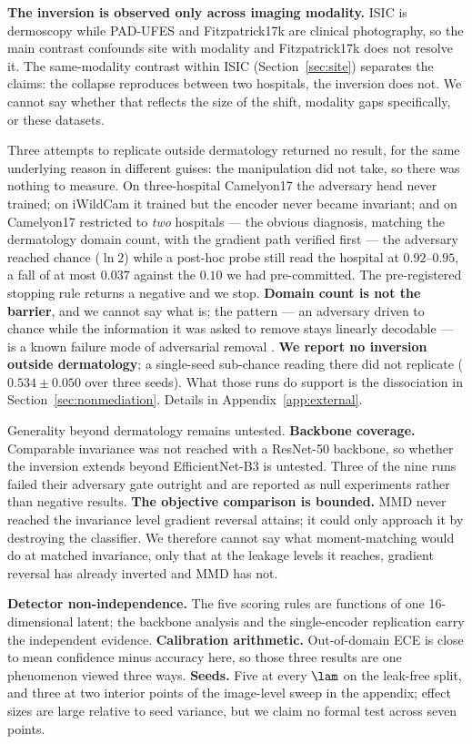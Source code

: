 \textbf{The inversion is observed only across imaging modality.} ISIC is dermoscopy
while PAD-UFES and Fitzpatrick17k are clinical photography, so the main contrast
confounds site with modality and Fitzpatrick17k does not resolve it. The
same-modality contrast within ISIC (Section~\ref{sec:site}) separates the claims: the
collapse reproduces between two hospitals, the inversion does not. We cannot say
whether that reflects the size of the shift, modality gaps specifically, or these
datasets.

Three attempts to replicate outside dermatology returned no result, for the same
underlying reason in different guises: the manipulation did not take, so there was
nothing to measure. On three-hospital Camelyon17 the adversary head never trained; on
iWildCam it trained but the encoder never became invariant; and on Camelyon17
restricted to \emph{two} hospitals --- the obvious diagnosis, matching the dermatology
domain count, with the gradient path verified first --- the adversary reached chance
($\ln 2$) while a post-hoc probe still read the hospital at $0.92$--$0.95$, a fall of
at most $0.037$ against the $0.10$ we had pre-committed. The pre-registered stopping
rule returns a negative and we stop. \textbf{Domain count is not the barrier}, and we
cannot say what is; the pattern --- an adversary driven to chance while the information
it was asked to remove stays linearly decodable --- is a known failure mode of
adversarial removal \cite{elazar2018}. \textbf{We report no inversion outside
dermatology}; a single-seed sub-chance reading there did not replicate
($0.534 \pm 0.050$ over three seeds). What those runs do support is the dissociation in
Section~\ref{sec:nonmediation}. Details in Appendix~\ref{app:external}.

Generality beyond dermatology remains untested. \textbf{Backbone coverage.} Comparable invariance was not reached with a ResNet-50
backbone, so whether the inversion extends beyond EfficientNet-B3 is untested. Three of
the nine runs failed their adversary gate outright and are reported as null experiments
rather than negative results. \textbf{The objective comparison is bounded.} MMD never reached the invariance
level gradient reversal attains; it could only approach it by destroying the
classifier. We therefore cannot say what moment-matching would do at matched
invariance, only that at the leakage levels it reaches, gradient reversal has
already inverted and MMD has not.

\textbf{Detector non-independence.} The five scoring rules are functions of one
16-dimensional latent; the backbone analysis and the single-encoder replication carry
the independent evidence. \textbf{Calibration arithmetic.} Out-of-domain ECE is close
to mean confidence minus accuracy here, so those three results are one phenomenon
viewed three ways. \textbf{Seeds.} Five at every $\lam$ on the leak-free split, and
three at two interior points of the image-level sweep in the appendix; effect sizes
are large relative to seed variance, but we claim no formal test across seven
points.

